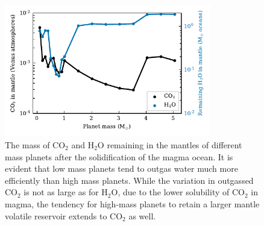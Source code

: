 \documentclass[bibyear,tradiabstract]{aa}
\begin{document}
\begin{figure}
\centering
\includegraphics[width=9cm]{reservoirplot_medium.pdf}
   \caption{The mass of CO$_2$ and H$_2$O remaining in the mantles of different mass planets after the solidification of the magma ocean. It is evident that low mass planets tend to outgas water much more efficiently than high mass planets. While the variation in outgassed CO$_2$ is not as large as for H$_2$O, due to the lower solubility of CO$_2$ in magma, the tendency for high-mass planets to retain a larger mantle volatile reservoir extends to CO$_2$ as well.}
      \label{Fig:reservoir}
\end{figure}
\end{document}
